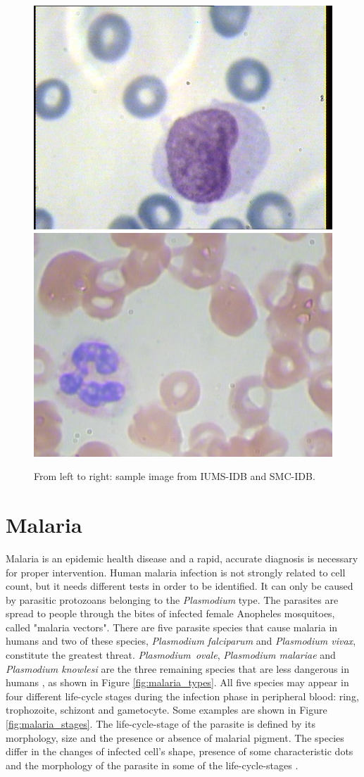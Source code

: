 \documentclass[final,a4paper,12pt,english]{UnicaPhdThesis3}
\begin{document}
\begin{figure}[h]
	\centering
	\includegraphics[height=0.33\textwidth]{images/2016_1_mva/IUMS}
	\includegraphics[height=0.33\textwidth]{images/2016_1_mva/SMC}
	\caption{\label{fig:datasets_samples}From left to right: sample image from IUMS-IDB and SMC-IDB.}
\end{figure}

\newpage
\section{Malaria}
Malaria is an epidemic health disease and a rapid, accurate diagnosis is necessary for proper intervention. 
Human malaria infection is not strongly related to cell count, but it needs different tests in order to be identified. It can only be caused by parasitic protozoans belonging to the \emph{Plasmodium} type. The parasites are spread to people through the bites of infected female Anopheles mosquitoes, called "malaria vectors".
There are five parasite species that cause malaria in humans and two of these species, \emph{Plasmodium falciparum} and \emph{Plasmodium vivax}, constitute the greatest threat. \emph{Plasmodium~ovale}, \emph{Plasmodium malariae} and \emph{Plasmodium knowlesi} are the three remaining species that are less dangerous in humans \cite{WHO_dec_2016}, as shown in Figure \ref{fig:malaria_types}.
All five species may appear in four different life-cycle stages during the infection phase in peripheral blood: ring, trophozoite, schizont and gametocyte. Some examples are shown in Figure \ref{fig:malaria_stages}.
The life-cycle-stage of the parasite is defined by its morphology, size and the presence or absence of malarial pigment.
The species differ in the changes of infected cell's shape, presence of some characteristic dots and the morphology of the parasite in some of the life-cycle-stages \cite{Somasekar2011}.
\end{document}
